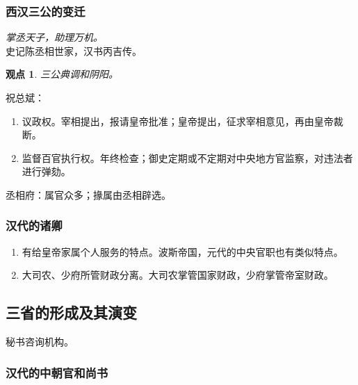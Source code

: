 \documentclass[twoside]{article}
\newtheorem{claim}[theorem]{观点}
\begin{document}
\subsubsection{西汉三公的变迁}
\textit{掌丞天子，助理万机。}\\
史记陈丞相世家，汉书丙吉传。\\
\begin{claim}
    三公典调和阴阳。
\end{claim}
祝总斌：
\begin{enumerate}
    \item 议政权。宰相提出，报请皇帝批准；皇帝提出，征求宰相意见，再由皇帝裁断。
    \item 监督百官执行权。年终检查；御史定期或不定期对中央地方官监察，对违法者进行弹劾。
\end{enumerate}
丞相府：属官众多；掾属由丞相辟选。
\subsubsection{汉代的诸卿}
\begin{enumerate}
    \item 有给皇帝家属个人服务的特点。波斯帝国，元代的中央官职也有类似特点。
    \item 大司农、少府所管财政分离。大司农掌管国家财政，少府掌管帝室财政。
\end{enumerate}
\subsection{三省的形成及其演变}
秘书咨询机构。\\
\subsubsection{汉代的中朝官和尚书}
\end{document}
